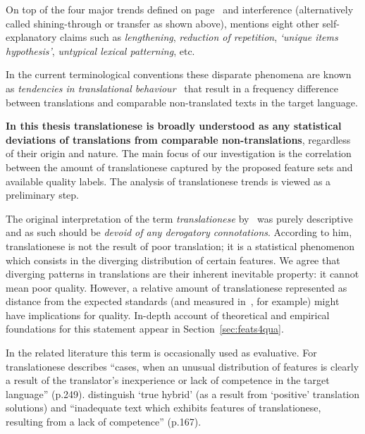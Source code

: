 On top of the four major trends defined on page~\pageref{pg:major_trends} and interference (alternatively called shining-through or transfer as shown above), \citet{Chesterman2004} mentions eight other self-explanatory claims such as \textit{lengthening}, \textit{reduction of repetition}, \textit{`unique items hypothesis'}, \textit{untypical lexical patterning}, etc.

In the current terminological conventions these disparate phenomena are known as \textit{tendencies in translational behaviour}~\cite[see the use of the term in][]{Laviosa2008, Cappelle2017} that result in a frequency difference between translations and comparable non-translated texts in the target language.

\textbf{In this thesis translationese is broadly understood as any statistical deviations of translations from comparable non-translations}, regardless of their origin and nature. The main focus of our investigation is the correlation between the amount of translationese captured by the proposed feature sets and available quality labels. The analysis of translationese trends is viewed as a preliminary step. 

The original interpretation of the term \textit{translationese} by~\citet{Gellerstam1986} was purely descriptive and as such should be \textit{devoid of any derogatory connotations}. According to him, translationese is not the result of poor translation; it is a statistical phenomenon which consists in the diverging distribution of certain features.
We agree that diverging patterns in translations are their inherent inevitable property: it cannot mean poor quality. However, a relative amount of translationese represented as distance from the expected standards (and measured in~\citet{Sutter2017}, for example) might have implications for quality. In-depth account of theoretical and empirical foundations for this statement appear in Section~\ref{sec:feats4qua}. 

In the related literature this term is occasionally used as \hypertarget{wd:evaluative}{evaluative}. For~\citet{Baker1993} translationese describes ``cases, when an unusual distribution of features is clearly a result of the translator's inexperience or lack of competence in the target language'' (p.249). \citet{BlumKulka1986} distinguish `true hybrid' (as a result from `positive' translation solutions) and ``inadequate text which exhibits features of translationese, resulting from a lack of competence'' (p.167). 

